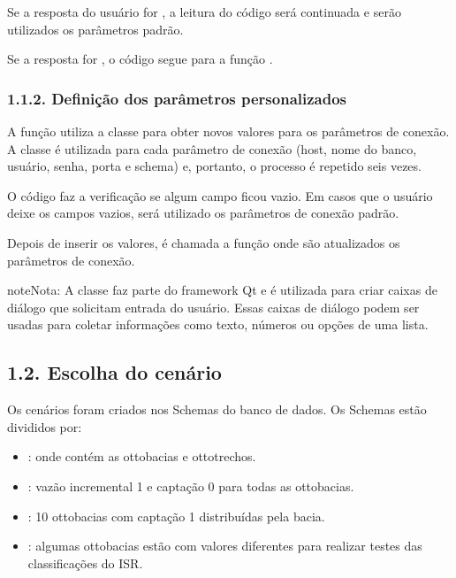 \documentclass[a4paper,10pt,brazil]{sphinxmanual}
\begin{document}
\sphinxAtStartPar
Se a resposta do usuário for , a leitura do código será continuada e serão utilizados os parâmetros padrão.

\sphinxAtStartPar
Se a resposta for , o código segue para a função .


\subsubsection{1.1.2. Definição dos parâmetros personalizados}
\label{\detokenize{1conexaoBancoDados:definicao-dos-parametros-personalizados}}
\sphinxAtStartPar
A função  utiliza a classe  para obter novos valores para os parâmetros de conexão. A classe é utilizada para cada parâmetro de conexão (host, nome do banco, usuário, senha, porta e schema) e, portanto, o processo é repetido seis vezes.

\sphinxAtStartPar
O código faz a verificação se algum campo ficou vazio. Em casos que o usuário deixe os campos vazios, será utilizado os parâmetros de conexão padrão.

\sphinxAtStartPar
Depois de inserir os valores, é chamada a função  onde são atualizados os parâmetros de conexão.

\begin{sphinxadmonition}{note}{Nota:}
\sphinxAtStartPar
A classe  faz parte do framework Qt e é utilizada para criar caixas de diálogo que solicitam entrada do usuário. Essas caixas de diálogo podem ser usadas para coletar informações como texto, números ou opções de uma lista.
\end{sphinxadmonition}


\subsection{1.2. Escolha do cenário}
\label{\detokenize{1conexaoBancoDados:escolha-do-cenario}}
\sphinxAtStartPar
Os cenários foram criados nos Schemas do banco de dados. Os Schemas estão divididos por:
\begin{itemize}
\item {} 
\sphinxAtStartPar
{}: onde contém as ottobacias e ottotrechos.

\item {} 
\sphinxAtStartPar
{}: vazão incremental 1 e captação 0 para todas as ottobacias.

\item {} 
\sphinxAtStartPar
{}: 10 ottobacias com captação 1 distribuídas pela bacia.

\item {} 
\sphinxAtStartPar
{}: algumas ottobacias estão com valores diferentes para realizar testes das classificações do ISR.

\end{itemize}
\end{document}
